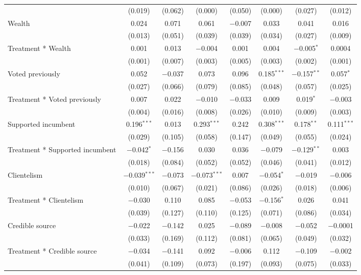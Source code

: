 \documentclass[]{article}
\begin{document}
\begin{table}[!htbp]
\begin{tabular}{@{\extracolsep{1pt}}lccccccc}
  & (0.019) & (0.062) & (0.000) & (0.050) & (0.000) & (0.027) & (0.012) \\ 
  Wealth & 0.024 & 0.071 & 0.061 & $-$0.007 & 0.033 & 0.041 & 0.016 \\ 
  & (0.013) & (0.051) & (0.039) & (0.039) & (0.034) & (0.027) & (0.009) \\ 
  Treatment * Wealth & 0.001 & 0.013 & $-$0.004 & 0.001 & 0.004 & $-$0.005$^{*}$ & 0.0004 \\ 
  & (0.001) & (0.007) & (0.003) & (0.005) & (0.003) & (0.002) & (0.001) \\ 
  Voted previously & 0.052 & $-$0.037 & 0.073 & 0.096 & 0.185$^{***}$ & $-$0.157$^{**}$ & 0.057$^{*}$ \\ 
  & (0.027) & (0.066) & (0.079) & (0.085) & (0.048) & (0.057) & (0.025) \\ 
  Treatment * Voted previously & 0.007 & 0.022 & $-$0.010 & $-$0.033 & 0.009 & 0.019$^{*}$ & $-$0.003 \\ 
  & (0.004) & (0.016) & (0.008) & (0.026) & (0.010) & (0.009) & (0.003) \\ 
  Supported incumbent & 0.196$^{***}$ & 0.013 & 0.293$^{***}$ & 0.242 & 0.308$^{***}$ & 0.178$^{**}$ & 0.111$^{***}$ \\ 
  & (0.029) & (0.105) & (0.058) & (0.147) & (0.049) & (0.055) & (0.024) \\ 
  Treatment * Supported incumbent & $-$0.042$^{*}$ & $-$0.156 & 0.030 & 0.036 & $-$0.079 & $-$0.129$^{**}$ & 0.003 \\ 
  & (0.018) & (0.084) & (0.052) & (0.052) & (0.046) & (0.041) & (0.012) \\ 
  Clientelism & $-$0.039$^{***}$ & $-$0.073 & $-$0.073$^{***}$ & 0.007 & $-$0.054$^{*}$ & $-$0.019 & $-$0.006 \\ 
  & (0.010) & (0.067) & (0.021) & (0.086) & (0.026) & (0.018) & (0.006) \\ 
  Treatment * Clientelism & $-$0.030 & 0.110 & 0.085 & $-$0.053 & $-$0.156$^{*}$ & 0.026 & 0.041 \\ 
  & (0.039) & (0.127) & (0.110) & (0.125) & (0.071) & (0.086) & (0.034) \\ 
  Credible source & $-$0.022 & $-$0.142 & 0.025 & $-$0.089 & $-$0.008 & $-$0.052 & $-$0.0001 \\ 
  & (0.033) & (0.169) & (0.112) & (0.081) & (0.065) & (0.049) & (0.032) \\ 
  Treatment * Credible source & $-$0.034 & $-$0.141 & 0.092 & $-$0.006 & 0.112 & $-$0.109 & $-$0.002 \\ 
  & (0.041) & (0.109) & (0.073) & (0.197) & (0.093) & (0.075) & (0.033) \\ 

\end{tabular}
\end{table}
\end{document}
